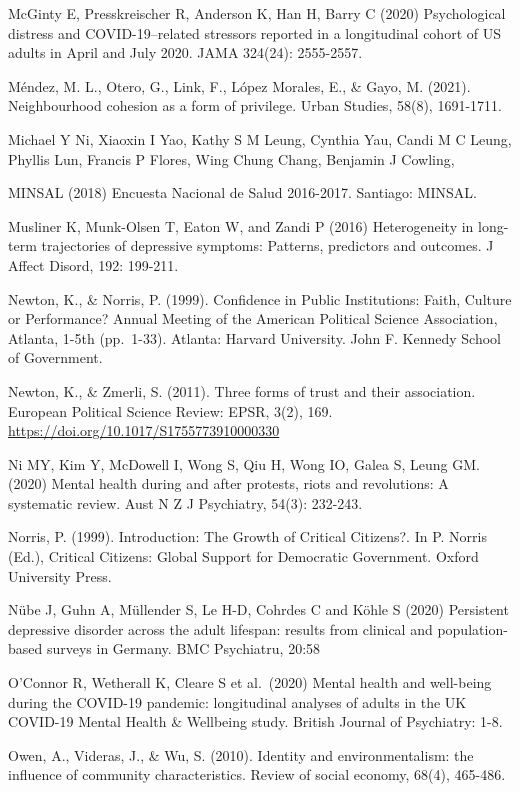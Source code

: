 \documentclass[
  12pt,
]{book}
\begin{document}
McGinty E, Presskreischer R, Anderson K, Han H, Barry C (2020) Psychological distress and COVID-19--related stressors reported in a longitudinal cohort of US adults in April and July 2020. JAMA 324(24): 2555-2557.

Méndez, M. L., Otero, G., Link, F., López Morales, E., \& Gayo, M. (2021). Neighbourhood cohesion as a form of privilege. Urban Studies, 58(8), 1691-1711.

Michael Y Ni, Xiaoxin I Yao, Kathy S M Leung, Cynthia Yau, Candi M C Leung, Phyllis Lun, Francis P Flores, Wing Chung Chang, Benjamin J Cowling,

MINSAL (2018) Encuesta Nacional de Salud 2016-2017. Santiago: MINSAL.

Musliner K, Munk-Olsen T, Eaton W, and Zandi P (2016) Heterogeneity in long-term trajectories of depressive symptoms: Patterns, predictors and outcomes. J Affect Disord, 192: 199-211.

Newton, K., \& Norris, P. (1999). Confidence in Public Institutions: Faith, Culture or Performance? Annual Meeting of the American Political Science Association, Atlanta, 1-5th (pp.~1-33). Atlanta: Harvard University. John F. Kennedy School of Government.

Newton, K., \& Zmerli, S. (2011). Three forms of trust and their association. European Political Science Review: EPSR, 3(2), 169. \url{https://doi.org/10.1017/S1755773910000330}

Ni MY, Kim Y, McDowell I, Wong S, Qiu H, Wong IO, Galea S, Leung GM. (2020) Mental health during and after protests, riots and revolutions: A systematic review. Aust N Z J Psychiatry, 54(3): 232-243.

Norris, P. (1999). Introduction: The Growth of Critical Citizens?. In P. Norris (Ed.), Critical Citizens: Global Support for Democratic Government. Oxford University Press.

Nübe J, Guhn A, Müllender S, Le H-D, Cohrdes C and Köhle S (2020) Persistent depressive disorder across the adult lifespan: results from clinical and population-based surveys in Germany. BMC Psychiatru, 20:58

O'Connor R, Wetherall K, Cleare S et al.~(2020) Mental health and well-being during the COVID-19 pandemic: longitudinal analyses of adults in the UK COVID-19 Mental Health \& Wellbeing study. British Journal of Psychiatry: 1-8.

Owen, A., Videras, J., \& Wu, S. (2010). Identity and environmentalism: the influence of community characteristics. Review of social economy, 68(4), 465-486.
\end{document}
